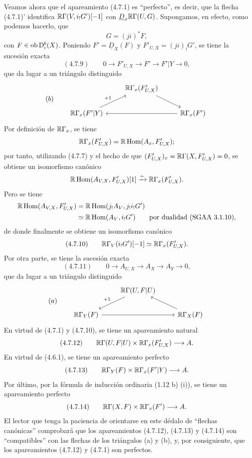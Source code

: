 Veamos ahora que el apareamiento (4.7.1) es \textquotedblleft perfecto\textquotedblright{}, es decir, que la flecha (4.7.1)' identifica $\mathbb{R}\Gamma(V,i_!G')[-1]$ con $\underline{D}_x\mathbb{R}\Gamma(U,G)$. Supongamos, en efecto, como podemos hacerlo, que
\[
G=(ji)^*F,
\]
con $F\in\operatorname{ob}\mathrm{D}_c^b(X)$. Poniendo $F'=\underline{D}_X(F)$ y $F'_{U,X}=(ji)_!G'$, se tiene la sucesión exacta
\[
(4.7.9)\qquad 0\longrightarrow F'_{U,X}\longrightarrow F'\longrightarrow F'|Y\longrightarrow0,
\]
que da lugar a un triángulo distinguido
\[
(b)\qquad
\begin{tikzcd}
& \R\Gamma_x(F'_{U,X}) \arrow[dr] \\
\R\Gamma_x(F'|Y) \arrow[ur,"{+1}"] && \R\Gamma_x(F') \arrow[ll]
\end{tikzcd}
\]
Por definición de $\mathbb{R}\Gamma_x$, se tiene
\[
\mathbb{R}\Gamma_x(F'_{U,X})=\mathbb{R}\operatorname{Hom}(A_x,F'_{U,X});
\]
por tanto, utilizando (4.7.7) y el hecho de que $(F'_{U,X})_x=\mathbb{R}\Gamma(X,F'_{U,X})=0$, se obtiene un isomorfismo canónico
\[
\mathbb{R}\operatorname{Hom}(A_{V,X},F'_{U,X})[1]\xrightarrow{\sim}\mathbb{R}\Gamma_x(F'_{U,X}).
\]
Pero se tiene
\[
\begin{aligned}
\mathbb{R}\operatorname{Hom}(A_{V,X},F'_{U,X})&=\mathbb{R}\operatorname{Hom}(j_!A_V,j_!i_!G')\\
&\simeq\mathbb{R}\operatorname{Hom}(A_V,i_!G')\qquad\text{por dualidad (SGAA~3.1.10)},
\end{aligned}
\]
de donde finalmente se obtiene un isomorfismo canónico
\[
(4.7.10)\qquad \mathbb{R}\Gamma_V(i_!G')[-1]\simeq\mathbb{R}\Gamma_x(F'_{U,X}).
\]
Por otra parte, se tiene la sucesión exacta
\[
(4.7.11)\qquad 0\longrightarrow A_{U,X}\longrightarrow A_X\longrightarrow A_Y\longrightarrow0,
\]
que da lugar a un triángulo distinguido
\[
(a)\qquad
\begin{tikzcd}
& \R\Gamma(U,F|U) \arrow[dl,"{+1}"'] \\
\R\Gamma_Y(F) \arrow[rr] && \R\Gamma_X(F) \arrow[ul]
\end{tikzcd}
\]
En virtud de (4.7.1) y (4.7.10), se tiene un apareamiento natural
\[
(4.7.12)\qquad \mathbb{R}\Gamma(U,F|U)\times\mathbb{R}\Gamma_x(F'_{U,X})\longrightarrow A.
\]
En virtud de (4.6.1), se tiene un apareamiento perfecto
\[
(4.7.13)\qquad \mathbb{R}\Gamma_Y(F)\times\mathbb{R}\Gamma_x(F'|Y)\longrightarrow A.
\]
Por último, por la fórmula de inducción ordinaria (1.12 b) (i)), se tiene un apareamiento perfecto
\[
(4.7.14)\qquad \mathbb{R}\Gamma(X,F)\times\mathbb{R}\Gamma_x(F')\longrightarrow A.
\]
El lector que tenga la paciencia de orientarse en este dédalo de \textquotedblleft flechas canónicas\textquotedblright{} comprobará que los apareamientos (4.7.12), (4.7.13) y (4.7.14) son \textquotedblleft compatibles\textquotedblright{} con las flechas de los triángulos (a) y (b), y, por consiguiente, que los apareamientos (4.7.12) y (4.7.1) son perfectos.

